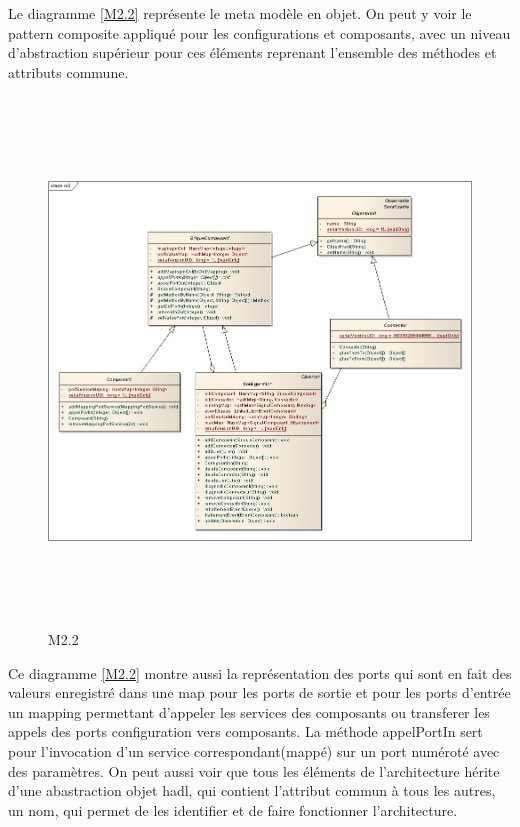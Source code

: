 \documentclass[11pt,a4paper]{article}
\begin{document}
Le diagramme \ref{M2.2} représente le meta modèle en objet. On peut y voir le pattern composite appliqué pour les configurations et composants, avec un niveau d'abstraction supérieur pour ces éléments reprenant l'ensemble des méthodes et attributs commune.

\begin{figure}[h]
  		\centering
  		\includegraphics[height=14cm,width=15cm]{m2impl.jpg}
  		\caption{M2.2}
  		\label{Meta modèle objet}
\end{figure}

Ce diagramme \ref{M2.2} montre aussi la représentation des ports qui sont en fait des valeurs enregistré dans une map pour les ports de sortie et pour les ports d'entrée un mapping permettant d'appeler les services des composants ou transferer les appels des ports configuration vers composants. La méthode appelPortIn sert pour l'invocation d'un service correspondant(mappé) sur un port numéroté avec des paramètres. On peut aussi voir que tous les éléments de l'architecture hérite d'une abastraction objet hadl, qui contient l'attribut commun à tous les autres, un nom, qui permet de les identifier et de faire fonctionner l'architecture. 
\end{document}
